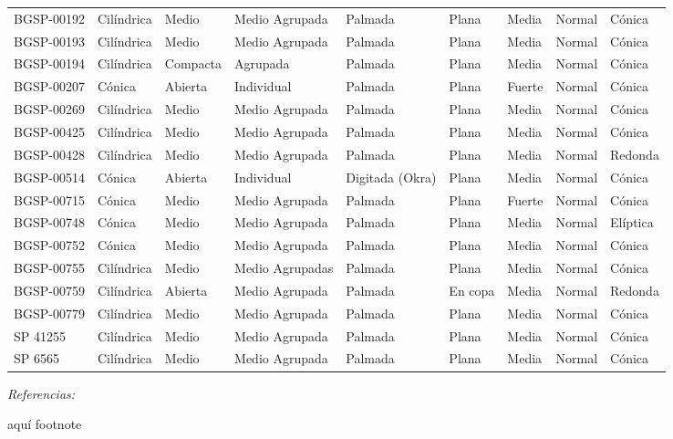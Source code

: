 \documentclass[12pt,oneside]{reedthesis}
\begin{document}
\begin{table}[!h]
{\begin{threeparttable}
\begin{tabular}[t]{lllllllll}
\addlinespace
BGSP-00192 & Cilíndrica & Medio & Medio Agrupada & Palmada & Plana & Media & Normal & Cónica\\
BGSP-00193 & Cilíndrica & Medio & Medio Agrupada & Palmada & Plana & Media & Normal & Cónica\\
BGSP-00194 & Cilíndrica & Compacta & Agrupada & Palmada & Plana & Media & Normal & Cónica\\
BGSP-00207 & Cónica & Abierta & Individual & Palmada & Plana & Fuerte & Normal & Cónica\\
BGSP-00269 & Cilíndrica & Medio & Medio Agrupada & Palmada & Plana & Media & Normal & Cónica\\
\addlinespace
BGSP-00425 & Cilíndrica & Medio & Medio Agrupada & Palmada & Plana & Media & Normal & Cónica\\
BGSP-00428 & Cilíndrica & Medio & Medio Agrupada & Palmada & Plana & Media & Normal & Redonda\\
BGSP-00514 & Cónica & Abierta & Individual & Digitada (Okra) & Plana & Media & Normal & Cónica\\
BGSP-00715 & Cónica & Medio & Medio Agrupada & Palmada & Plana & Fuerte & Normal & Cónica\\
BGSP-00748 & Cónica & Medio & Medio Agrupada & Palmada & Plana & Media & Normal & Elíptica\\
\addlinespace
BGSP-00752 & Cónica & Medio & Medio Agrupada & Palmada & Plana & Media & Normal & Cónica\\
BGSP-00755 & Cilíndrica & Medio & Medio Agrupadas & Palmada & Plana & Media & Normal & Cónica\\
BGSP-00759 & Cilíndrica & Abierta & Medio Agrupada & Palmada & En copa & Media & Normal & Redonda\\
BGSP-00779 & Cilíndrica & Medio & Medio Agrupada & Palmada & Plana & Media & Normal & Cónica\\
SP 41255 & Cilíndrica & Medio & Medio Agrupada & Palmada & Plana & Media & Normal & Cónica\\
\addlinespace
SP 6565 & Cilíndrica & Medio & Medio Agrupada & Palmada & Plana & Media & Normal & Cónica\\
\bottomrule
\end{tabular}
\begin{tablenotes}[para]
\item \textit{Referencias:} 
\item aquí footnote
\end{tablenotes}
\end{threeparttable}}
\end{table}
\end{document}
